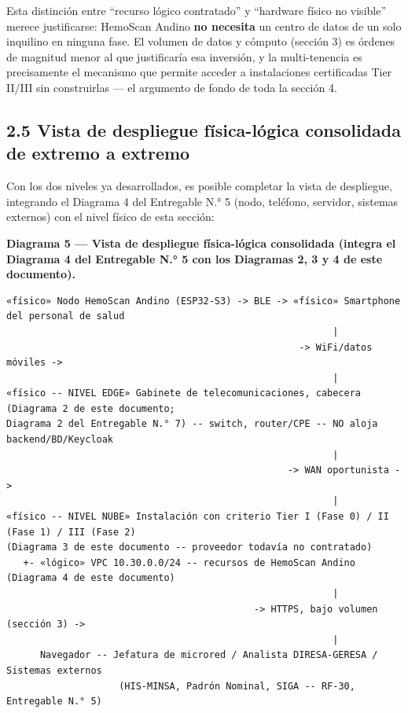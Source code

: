 \documentclass[11pt,a4paper]{article}
\begin{document}
Esta distinción entre ``recurso lógico contratado'' y ``hardware físico no visible'' merece justificarse: HemoScan Andino \textbf{no necesita} un centro de datos de un solo inquilino en ninguna fase. El volumen de datos y cómputo (sección 3) es órdenes de magnitud menor al que justificaría esa inversión, y la multi-tenencia es precisamente el mecanismo que permite acceder a instalaciones certificadas Tier II/III sin construirlas --- el argumento de fondo de toda la sección 4.

\subsection{2.5 Vista de despliegue física-lógica consolidada de extremo a extremo}\label{vista-de-despliegue-fuxedsica-luxf3gica-consolidada-de-extremo-a-extremo}

Con los dos niveles ya desarrollados, es posible completar la vista de despliegue, integrando el Diagrama 4 del Entregable N.° 5 (nodo, teléfono, servidor, sistemas externos) con el nivel físico de esta sección:

\textbf{Diagrama 5 --- Vista de despliegue física-lógica consolidada (integra el Diagrama 4 del Entregable N.° 5 con los Diagramas 2, 3 y 4 de este documento).}

\begin{samepage}\begin{verbatim}
«físico» Nodo HemoScan Andino (ESP32-S3) -> BLE -> «físico» Smartphone del personal de salud
                                                          |
                                                    -> WiFi/datos móviles ->
                                                          |
«físico -- NIVEL EDGE» Gabinete de telecomunicaciones, cabecera (Diagrama 2 de este documento;
Diagrama 2 del Entregable N.° 7) -- switch, router/CPE -- NO aloja backend/BD/Keycloak
                                                          |
                                                  -> WAN oportunista ->
                                                          |
«físico -- NIVEL NUBE» Instalación con criterio Tier I (Fase 0) / II (Fase 1) / III (Fase 2)
(Diagrama 3 de este documento -- proveedor todavía no contratado)
   +- «lógico» VPC 10.30.0.0/24 -- recursos de HemoScan Andino (Diagrama 4 de este documento)
                                                          |
                                            -> HTTPS, bajo volumen (sección 3) ->
                                                          |
      Navegador -- Jefatura de microred / Analista DIRESA-GERESA / Sistemas externos
                    (HIS-MINSA, Padrón Nominal, SIGA -- RF-30, Entregable N.° 5)
\end{verbatim}\end{samepage}
\end{document}
